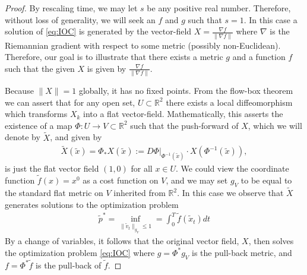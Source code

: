 \documentclass[letterpaper,10pt,conference]{ieeeconf}
\begin{document}
\begin{proof}
	By rescaling time, we may let $s$ be any positive real number.
	Therefore, without loss of generality, we will seek an $f$ and $g$ such that $s=1$.
	In this case a solution of \eqref{eq:IOC} is generated by the vector-field $X = \frac{\nabla f}{ \| \nabla f\|}$ where $\nabla$ is the Riemannian gradient with respect to some metric (possibly non-Euclidean).
	Therefore, our goal is to illustrate that there exists a metric $g$ and a function $f$ such that the given $X$ is given by $\frac{\nabla f}{ \| \nabla f\|}$.

	Because $\| X \| = 1$ globally, it has no fixed points.
	From the flow-box theorem \cite[Theorem 4.1.14]{MTA} we can assert that for any open set, $U \subset \mathbb{R}^2$ there exists a local diffeomorphism which transforms $X_k$ into a flat vector-field.
	Mathematically, this asserts the existence of a map $\Phi : U \to V \subset \mathbb{R}^2$ such that the push-forward of $X$, which we will denote by $\tilde{X}$, and given by
	\begin{align*}
		\tilde{X}(\tilde{x}) = \Phi_* X(\tilde{x}) := \left. D\Phi \right|_{\Phi^{-1}(\tilde{x}) } \cdot X(  \Phi^{-1}(\tilde{x}) ),
	\end{align*}
	is just the flat vector field $(1,0)$ for all $x \in U$.
	We could view the coordinate function $\tilde{f}(x) = x^0$ as a cost function on $V$,
	and we may set $g_V$ to be equal to the standard flat metric on $V$ inherited from $\mathbb{R}^2$.
	In this case we observe that $\tilde{X}$ generates solutions to the optimization problem
	\begin{align*}
		\tilde{p}^* = \inf_{ \| \tilde{v}_t \|_{g_V} \leq 1} = \int_0^T \tilde{f}( \tilde{x}_t ) dt
	\end{align*}
	By a change of variables, it follows that the original vector field, $X$, then solves the optimization problem \eqref{eq:IOC}
	where $g = \Phi^* g_V$ is the pull-back metric, and $f = \Phi^* \tilde{f}$ is the pull-back of $\tilde{f}$.
\end{proof}





\end{document}
